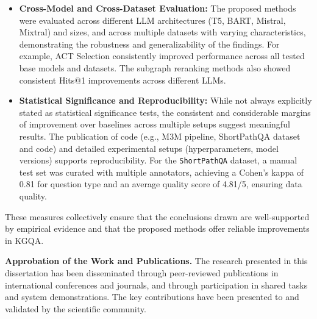 \begin{itemize}
    \item \textbf{Cross-Model and Cross-Dataset Evaluation:} The proposed methods were evaluated across different LLM architectures (T5, BART, Mistral, Mixtral) and sizes, and across multiple datasets with varying characteristics, demonstrating the robustness and generalizability of the findings. For example, ACT Selection consistently improved performance across all tested base models and datasets. The subgraph reranking methods also showed consistent Hits@1 improvements across different LLMs.
    \item \textbf{Statistical Significance and Reproducibility:} While not always explicitly stated as statistical significance tests, the consistent and considerable margins of improvement over baselines across multiple setups suggest meaningful results. The publication of code (e.g., M3M pipeline, ShortPathQA dataset and code) and detailed experimental setups (hyperparameters, model versions) supports reproducibility. For the \texttt{ShortPathQA} dataset, a manual test set was curated with multiple annotators, achieving a Cohen's kappa of 0.81 for question type and an average quality score of 4.81/5, ensuring data quality.
\end{itemize}
These measures collectively ensure that the conclusions drawn are well-supported by empirical evidence and that the proposed methods offer reliable improvements in KGQA.

\textbf{Approbation of the Work and Publications.}
The research presented in this dissertation has been disseminated through peer-reviewed publications in international conferences and journals, and through participation in shared tasks and system demonstrations. The key contributions have been presented to and validated by the scientific community.

